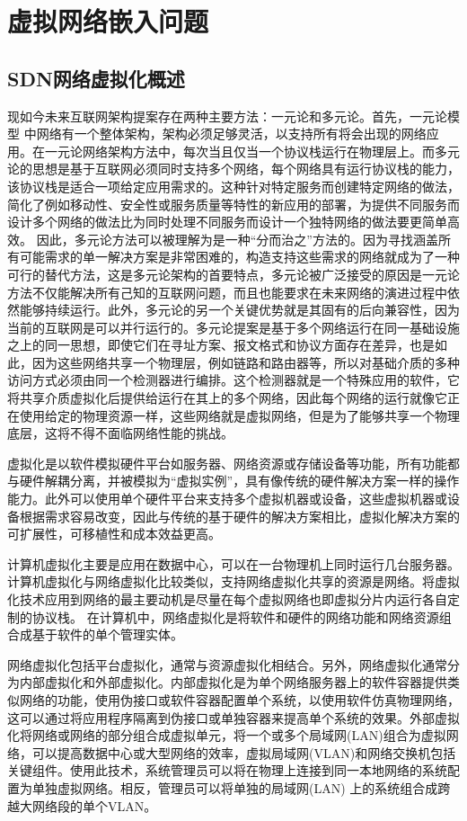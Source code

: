 \chapter{虚拟网络嵌入问题}
\section{SDN网络虚拟化概述}
现如今未来互联网架构提案存在两种主要方法：一元论和多元论。首先，一元论模型 中网络有一个整体架构，架构必须足够灵活，以支持所有将会出现的网络应用。在一元论网络架构方法中，每次当且仅当一个协议栈运行在物理层上。而多元论的思想是基于互联网必须同时支持多个网络，每个网络具有运行协议栈的能力，该协议栈是适合一项给定应用需求的。这种针对特定服务而创建特定网络的做法，简化了例如移动性、安全性或服务质量等特性的新应用的部署，为提供不同服务而设计多个网络的做法比为同时处理不同服务而设计一个独特网络的做法要更简单高效。 因此，多元论方法可以被理解为是一种“分而治之”方法的。因为寻找涵盖所有可能需求的单一解决方案是非常困难的，构造支持这些需求的网络就成为了一种可行的替代方法，这是多元论架构的首要特点，多元论被广泛接受的原因是一元论方法不仅能解决所有己知的互联网问题，而且也能要求在未来网络的演进过程中依然能够持续运行。此外，多元论的另一个关键优势就是其固有的后向兼容性，因为当前的互联网是可以并行运行的。多元论提案是基于多个网络运行在同一基础设施之上的同一思想，即使它们在寻址方案、报文格式和协议方面存在差异，也是如此，因为这些网络共享一个物理层，例如链路和路由器等，所以对基础介质的多种访问方式必须由同一个检测器进行编排。这个检测器就是一个特殊应用的软件，它将共享介质虚拟化后提供给运行在其上的多个网络，因此每个网络的运行就像它正在使用给定的物理资源一样，这些网络就是虚拟网络，但是为了能够共享一个物理底层，这将不得不面临网络性能的挑战。

虚拟化是以软件模拟硬件平台如服务器、网络资源或存储设备等功能，所有功能都与硬件解耦分离，并被模拟为“虚拟实例”，具有像传统的硬件解决方案一样的操作能力。此外可以使用单个硬件平台来支持多个虚拟机器或设备，这些虚拟机器或设备根据需求容易改变，因此与传统的基于硬件的解决方案相比，虚拟化解决方案的可扩展性，可移植性和成本效益更高。

计算机虚拟化主要是应用在数据中心，可以在一台物理机上同时运行几台服务器。计算机虚拟化与网络虚拟化比较类似，支持网络虚拟化共享的资源是网络。将虚拟化技术应用到网络的最主要动机是尽量在每个虚拟网络也即虚拟分片内运行各自定制的协议栈。 在计算机中，网络虚拟化是将软件和硬件的网络功能和网络资源组合成基于软件的单个管理实体。

网络虚拟化包括平台虚拟化，通常与资源虚拟化相结合。另外，网络虚拟化通常分为内部虚拟化和外部虚拟化。内部虚拟化是为单个网络服务器上的软件容器提供类似网络的功能，使用伪接口或软件容器配置单个系统，以使用软件仿真物理网络，这可以通过将应用程序隔离到伪接口或单独容器来提高单个系统的效果。外部虚拟化将网络或网络的部分组合成虚拟单元，将一个或多个局域网(LAN)组合为虚拟网络，可以提高数据中心或大型网络的效率，虚拟局域网(VLAN)和网络交换机包括关键组件。使用此技术，系统管理员可以将在物理上连接到同一本地网络的系统配置为单独虚拟网络。相反，管理员可以将单独的局域网(LAN) 上的系统组合成跨越大网络段的单个VLAN。



